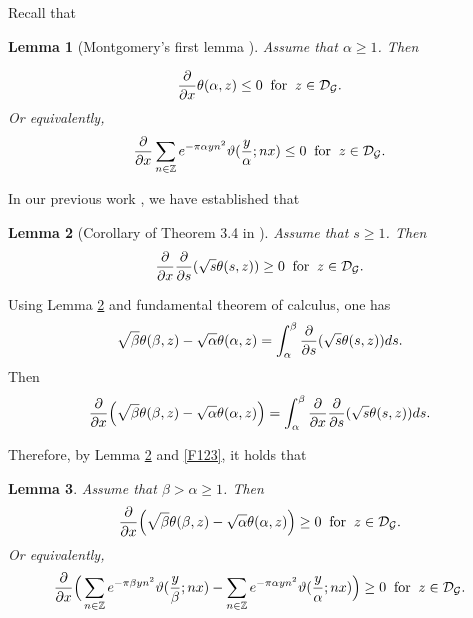 \documentclass[reqno,english]{amsart}
\newtheorem{lemma}{Lemma}[section]
\newtheorem{open problem}{Open Problem}[section]
\newtheorem{open question}{Open Question}[section]
\newtheorem{open questions on hexagonal lattice}{Open Questions on hexagonal lattice}[section]
\begin{document}
Recall that
\begin{lemma}[Montgomery's first lemma \cite{Mon1988}]\label{Lemma22} Assume that $\alpha\geq1$. Then

\begin{equation}\aligned\nonumber
\frac{\partial}{\partial x}\theta(\alpha,z)\leq0\;\;\hbox{for}\;\;z\in\mathcal{D}_{\mathcal{G}}.
\endaligned\end{equation}
Or equivalently,
\begin{equation}\aligned\nonumber
\frac{\partial}{\partial x}
\sum_{n\in\mathbb{Z}} e^{-\pi\alpha yn^2}\vartheta(\frac{y}{\alpha};nx)\leq0\;\;\hbox{for}\;\;z\in\mathcal{D}_{\mathcal{G}}.
\endaligned\end{equation}

\end{lemma}


In our previous work \cite{Luo2023a}, we have established that
\begin{lemma}[Corollary of Theorem 3.4 in \cite{Luo2023a}]\label{Lemma23}
Assume that $s\geq1$. Then
\begin{equation}\aligned\nonumber
\frac{\partial}{\partial x}\frac{\partial}{\partial s}(\sqrt{s}\theta(s,z))\geq0\;\;\hbox{for}\;\;z\in\mathcal{D}_{\mathcal{G}}.
\endaligned\end{equation}

\end{lemma}

Using Lemma \ref{Lemma23} and fundamental theorem of calculus, one has
\begin{equation}\aligned\nonumber
\sqrt{\beta}\theta(\beta,z)-\sqrt{\alpha}\theta(\alpha,z)=
\int_\alpha^\beta \frac{\partial}{\partial s}(\sqrt{s}\theta(s,z))ds.
\endaligned\end{equation}
Then
\begin{equation}\aligned\label{F123}
\frac{\partial}{\partial x}\Big(\sqrt{\beta}\theta(\beta,z)-\sqrt{\alpha}\theta(\alpha,z)\Big)=
\int_\alpha^\beta \frac{\partial}{\partial x}\frac{\partial}{\partial s}(\sqrt{s}\theta(s,z))ds.
\endaligned\end{equation}


Therefore, by Lemma \ref{Lemma23} and \eqref{F123}, it holds that

\begin{lemma}\label{Lemma24} Assume that $\beta>\alpha\geq1$. Then
\begin{equation}\aligned\label{nonumber}
\frac{\partial}{\partial x}\Big(
\sqrt{\beta}\theta(\beta,z)-\sqrt{\alpha}\theta(\alpha,z)\Big)\geq0
\;\;\hbox{for}\;\;z\in\mathcal{D}_{\mathcal{G}}.
\endaligned\end{equation}
Or equivalently,
\begin{equation}\aligned\label{CM2}
\frac{\partial}{\partial x}\Big(\sum_{n\in\mathbb{Z}} e^{-\pi\beta yn^2}\vartheta(\frac{y}{\beta};nx)-
\sum_{n\in\mathbb{Z}} e^{-\pi\alpha yn^2}\vartheta(\frac{y}{\alpha};nx)\Big)\geq0\;\;\hbox{for}\;\;z\in\mathcal{D}_{\mathcal{G}}.
\endaligned\end{equation}
\end{lemma}
\end{document}
